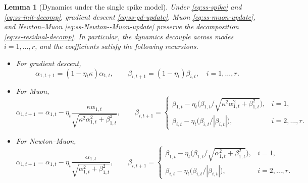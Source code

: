 \documentclass[11pt]{article}
\newtheorem{lemma}{Lemma}
\begin{document}
\begin{lemma}[Dynamics under the single spike model]
\label{lem:ss-mode-wise}
Under \eqref{eq:ss-spike} and \eqref{eq:ss-init-decomp}, gradient descent \eqref{eq:ss-gd-update}, Muon \eqref{eq:ss-muon-update}, and Newton--Muon \eqref{eq:ss-Newton--Muon-update} preserve the decomposition \eqref{eq:ss-residual-decomp}. In particular, the dynamics decouple across modes $i=1,\dots,r$, and the coefficients satisfy the following recursions.
\begin{itemize}
\item For gradient descent,
\begin{equation}
\label{eq:ss-rec-gd}
\alpha_{1,t+1}=(1-\eta_t\kappa)\alpha_{1,t},
\qquad
\beta_{i,t+1}=(1-\eta_t)\beta_{i,t},\quad i=1,\dots,r.
\end{equation}

\item For Muon,
\begin{equation}
\label{eq:ss-rec-muon}
\alpha_{1,t+1}
=
\alpha_{1,t}
-
\eta_t \frac{\kappa\alpha_{1,t}}{\sqrt{\kappa^2\alpha_{1,t}^2+\beta_{1,t}^2}},
\qquad
\beta_{i,t+1}
=
\begin{cases}
\beta_{1,t}
-\eta_t \bigl(\beta_{1,t}/\sqrt{\kappa^2\alpha_{1,t}^2+\beta_{1,t}^2}\bigr),
& i=1, \\
\beta_{i,t}
-\eta_t \bigl(\beta_{i,t}/|\beta_{i,t}|\bigr),
& i=2,\dots,r.
\end{cases}
\end{equation}

\item For Newton--Muon,
\begin{equation}
\label{eq:ss-rec-Newton--Muon}
\alpha_{1,t+1}
=
\alpha_{1,t}
-
\eta_t \frac{\alpha_{1,t}}{\sqrt{\alpha_{1,t}^2+\beta_{1,t}^2}},
\qquad
\beta_{i,t+1}
=
\begin{cases}
\beta_{1,t}
-\eta_t \bigl(\beta_{1,t}/\sqrt{\alpha_{1,t}^2+\beta_{1,t}^2}\bigr),
& i=1, \\
\beta_{i,t}
-\eta_t \bigl(\beta_{i,t}/|\beta_{i,t}|\bigr),
& i=2,\dots,r.
\end{cases}
\end{equation}
\end{itemize}
\end{lemma}
\end{document}
